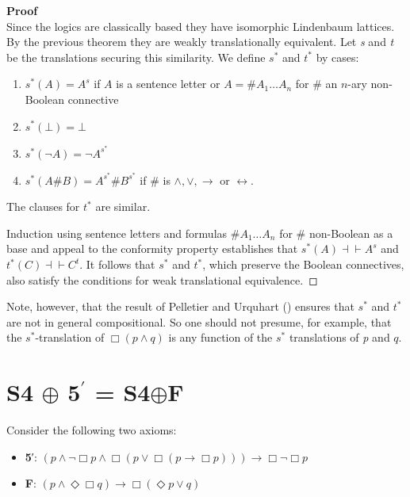 \documentclass[
  11pt,
  letterpaper,
  DIV=11,
  numbers=noendperiod,
  twoside]{scrartcl}
\providecommand{\tightlist}{%
  \setlength{\itemsep}{0pt}\setlength{\parskip}{0pt}}\usepackage{longtable,booktabs,array}
\begin{document}
\textbf{Proof}\\
Since the logics are classically based they have isomorphic Lindenbaum
lattices. By the previous theorem they are weakly translationally
equivalent. Let \emph{s} and \emph{t} be the translations securing this
similarity. We define \(s^*\) and \(t^*\) by cases:

\begin{enumerate}
\def\labelenumi{\arabic{enumi}.}
\tightlist
\item
  \(s^*(A)=A^s\) if \(A\) is a sentence letter or
  \(A = {\#}A_1{\ldots}A_n\) for \({\#}\) an \(n\)-ary non-Boolean
  connective
\item
  \(s^{*}(\bot)=\bot\)
\item
  \(s^{*}(\neg A)= \neg A^{s^{*}}\)
\item
  \(s^{*}(A{\#}B) = A^{s^{*}}\!{\#} B^{s^{*}}\) if \({\#}\) is
  \(\wedge ,\vee ,\rightarrow\) or \(\leftrightarrow\).
\end{enumerate}

The clauses for \(t^*\) are similar.

Induction using sentence letters and formulas \({\#}A_1{\ldots}A_n\) for
\({\#}\) non-Boolean as a base and appeal to the conformity property
establishes that \(s^*\!(A){\dashv}{\vdash}A^s\) and
\(t^*(C){\dashv}{\vdash}C^t\). It follows that \(s^*\) and \(t^*\),
which preserve the Boolean connectives, also satisfy the conditions for
weak translational equivalence.~◻

Note, however, that the result of Pelletier and Urquhart
() ensures that \(s^*\) and
\(t^*\) are not in general compositional. So one should not presume, for
example, that the \(s^*\)-translation of \(\Box (p\wedge q)\) is any
function of the \(s^*\) translations of \emph{p} and \(q\).

\section{\texorpdfstring{S4 \(\oplus\) 5\(^\prime\) =
S4\(\oplus\)F}{S4 \textbackslash oplus 5\^{}\textbackslash prime = S4\textbackslash oplusF}}\label{s4-oplus-5prime-s4oplusf}

Consider the following two axioms:

\begin{itemize}
\tightlist
\item
  \textbf{5}′:
  \((p \wedge \neg \Box p \wedge \Box (p \vee \Box (p \rightarrow \Box p))) \rightarrow \Box \neg \Box p\)
\item
  \textbf{F}:
  \((p\wedge \Diamond\Box q) \rightarrow \Box (\Diamond p\vee q)\)
\end{itemize}
\end{document}
